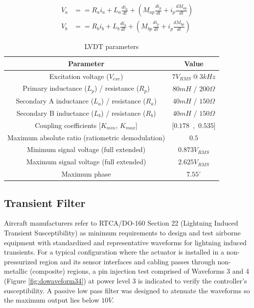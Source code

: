 \documentclass[conference]{IEEEtran}
\begin{document}
\begin{equation}
\begin{split}
V_a & == R_a i_a + L_a \frac{di_a}{dt} + \left(M_{ap} \frac{di_p}{dt} + i_p \frac{dM_{ap}}{dt}\right) \\
V_b & == R_b i_b + L_b \frac{di_b}{dt} + \left(M_{bp} \frac{di_p}{dt} + i_p \frac{dM_{bp}}{dt}\right)
\end{split}
\label{eq:vsecexpr}
\end{equation}

\begin{table}[h!]
\centering
\caption{LVDT parameters}
\label{tab:lvdtparam}
\begin{tabular}{|c|c|}
\hline
Parameter                            & Value        \\
\hline
Excitation voltage ($V_{exc}$) & $7V_{RMS}~@~3kHz$ \\ \hline
Primary inductance ($L_p$) / resistance ($R_p$) & $80mH$ / $200\Omega$ \\ \hline
Secondary A inductance ($L_a$) / resistance ($R_a$) & $40mH$ / $150\Omega$ \\ \hline
Secondary B inductance ($L_b$) / resistance ($R_b$) & $40mH$ / $150\Omega$ \\ \hline
Coupling coefficients [$K_{min}$, $K_{max}$] & [$0.178$~,~$0.535$] \\ \hline
Maximum absolute ratio (ratiometric demodulation) & $0.5$ \\ \hline
Minimum signal voltage (full extended) & $0.873 V_{RMS}$ \\ \hline
Maximum signal voltage (full extended) & $2.625 V_{RMS}$ \\ \hline
Maximum phase & $7.55^{\circ}$ \\ \hline
\end{tabular}
\end{table}


\subsection{Transient Filter}

Aircraft manufacturers refer to RTCA/DO-160 Section 22 (Lightning Induced Transient Susceptibility) \cite{do160} as minimum requirements to design and test airborne equipment with standardized and representative waveforms for lightning induced transients. For a typical configuration where the actuator is installed in a non-pressurized region and its sensor interfaces and cabling passes through non-metallic (composite) regions, a pin injection test comprised of Waveforms 3 and 4 (Figure \ref{fig:dowaveform34}) at power level 3 \cite{do160} is indicated to verify the controller's susceptibility. A passive low pass filter was designed to atenuate the waveforms so the maximum output lies below $10V$.%
\end{document}
